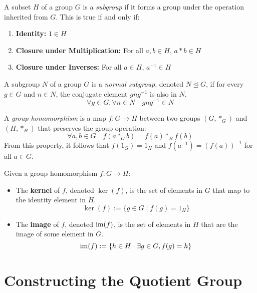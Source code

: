 \begin{definition}[Subgroup]
A subset $H$ of a group $G$ is a \emph{subgroup} if it forms a group under the operation inherited from $G$. This is true if and only if:
\begin{enumerate}
    \item \textbf{Identity:} $1 \in H$
    \item \textbf{Closure under Multiplication:} For all $a, b \in H$, $a * b \in H$
    \item \textbf{Closure under Inverses:} For all $a \in H$, $a^{-1} \in H$
\end{enumerate}
\end{definition}

\begin{definition}
A subgroup $N$ of a group $G$ is a \emph{normal subgroup}, denoted $N \trianglelefteq G$, if for every $g \in G$ and $n \in N$, the conjugate element $gng^{-1}$ is also in $N$.
\[
\forall g \in G, \forall n \in N \quad gng^{-1} \in N
\]
\end{definition}

\begin{definition}
A \emph{group homomorphism} is a map $f: G \to H$ between two groups $(G, *_G)$ and $(H, *_H)$ that preserves the group operation:
\[
\forall a, b \in G \quad f(a *_G b) = f(a) *_H f(b)
\]
From this property, it follows that $f(1_G) = 1_H$ and $f(a^{-1}) = (f(a))^{-1}$ for all $a \in G$.
\end{definition}

\begin{definition}
Given a group homomorphism $f: G \to H$:
\begin{itemize}
    \item The \textbf{kernel} of $f$, denoted $\ker(f)$, is the set of elements in $G$ that map to the identity element in $H$.
    \[ \ker(f) := \{ g \in G \mid f(g) = 1_H \} \]
    \item The \textbf{image} of $f$, denoted $\operatorname{im}(f)$, is the set of elements in $H$ that are the image of some element in $G$.
    \[ \operatorname{im}(f) := \{ h \in H \mid \exists g \in G, f(g) = h \} \]
\end{itemize}
\end{definition}

\section{Constructing the Quotient Group}

